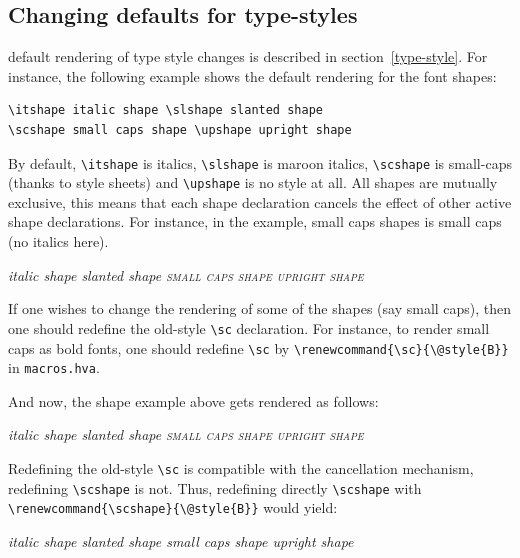 \subsection{Changing defaults for type-styles}\label{customize-style}
\hevea{} default rendering of type style changes is described in
section~\ref{type-style}.
For instance, the following example shows the default rendering
for the font shapes:
\begin{verbatim}
\itshape italic shape \slshape slanted shape
\scshape small caps shape \upshape upright shape
\end{verbatim}
By default, \verb+\itshape+ is italics, \verb+\slshape+ is maroon
italics, \verb+\scshape+ is small-caps (thanks to style sheets) and \verb+\upshape+ is no style at all.
All shapes are mutually exclusive, this means that each shape
declaration cancels the effect of other active shape declarations.
For instance, in the example, small caps shapes is small caps (no italics here).
\begin{htmlonly}
\begin{htmlout}
\itshape italic shape \slshape slanted shape
\scshape small caps shape \upshape upright shape
\end{htmlout}
\end{htmlonly}

If one wishes to change the rendering of some of the shapes (say small
caps), then one should redefine the old-style \verb+\sc+ declaration.
For instance, to render small caps as bold fonts, one should
redefine \verb+\sc+ by \verb+\renewcommand{\sc}{\@style{B}}+ in
\texttt{macros.hva}.


\begin{htmlonly}
And now, the shape example above gets rendered as follows:
\begin{htmlout}\renewcommand{\sc}{\@style{B}}
{\itshape italic shape \slshape slanted shape
\scshape small caps shape \upshape upright shape}
\end{htmlout}

Redefining the old-style \verb+\sc+ is compatible with the cancellation
mechanism, redefining \verb+\scshape+ is not.
Thus, redefining directly \LaTeXe{} \verb+\scshape+ with
\verb+\renewcommand{\scshape}{\@style{B}}+ would yield:
\begin{htmlout}\renewcommand{\scshape}{}
{\itshape italic shape \slshape slanted shape
\scshape small caps shape \upshape upright shape}
\end{htmlout}
\end{htmlonly}

